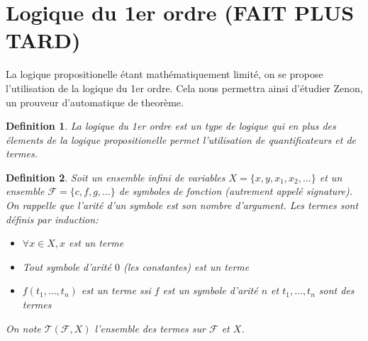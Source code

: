 \documentclass{paper}
\newtheorem{defi}{Definition}
\begin{document}
\section{Logique du 1er ordre (FAIT PLUS TARD)}
La logique propositionelle étant mathématiquement limité, on se propose l'utilisation de la logique du 1er ordre.
Cela nous permettra ainsi d'étudier Zenon, un prouveur d'automatique de theorème.
\begin{defi}
    La \textit{logique du 1er ordre} est un type de logique qui en plus des élements de la logique propositionelle permet l'utilisation de
    quantificateurs et de \textit{termes}.
\end{defi}

\begin{defi}
    Soit un ensemble infini de variables $X = \{x,y,x_1,x_2,\dots \}$ et un ensemble $\mathcal{F}=\{c,f,g,\dots \}$ de symboles de fonction (autrement appelé signature).
    On rappelle que l'arité d'un symbole est son nombre d'argument.
    Les termes sont définis par induction:
    \begin{itemize}
        \item $\forall x\in X, x$ est un terme
        \item Tout symbole d'arité $0$ (les constantes) est un terme
        \item $f(t_1,\dots,t_n)$ est un terme ssi $f$ est un symbole d'arité $n$ et $t_1,\dots,t_n$ sont des termes
    \end{itemize} 
    On note $\mathcal{T}(\mathcal{F}, X)$ l'ensemble des termes sur $\mathcal{F}$ et $X$.
\end{defi}
\end{document}
